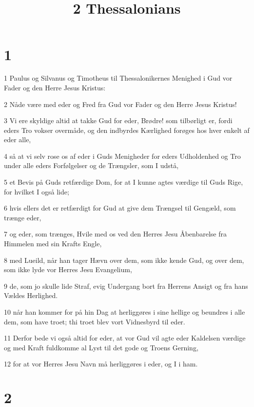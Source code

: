 

\title{2 Thessalonians}


\chapter{1}

\par 1 Paulus og Silvanus og Timotheus til Thessalonikernes Menighed i Gud vor Fader og den Herre Jesus Kristus:
\par 2 Nåde være med eder og Fred fra Gud vor Fader og den Herre Jesus Kristus!
\par 3 Vi ere skyldige altid at takke Gud for eder, Brødre! som tilbørligt er, fordi eders Tro vokser overmåde, og den indbyrdes Kærlighed forøges hos hver enkelt af eder alle,
\par 4 så at vi selv rose os af eder i Guds Menigheder for eders Udholdenhed og Tro under alle eders Forfølgelser og de Trængsler, som I udstå,
\par 5 et Bevis på Guds retfærdige Dom, for at I kunne agtes værdige til Guds Rige, for hvilket I også lide;
\par 6 hvis ellers det er retfærdigt for Gud at give dem Trængsel til Gengæld, som trænge eder,
\par 7 og eder, som trænges, Hvile med os ved den Herres Jesu Åbenbarelse fra Himmelen med sin Krafts Engle,
\par 8 med Lueild, når han tager Hævn over dem, som ikke kende Gud, og over dem, som ikke lyde vor Herres Jesu Evangelium,
\par 9 de, som jo skulle lide Straf, evig Undergang bort fra Herrens Ansigt og fra hans Vældes Herlighed.
\par 10 når han kommer for på hin Dag at herliggøres i sine hellige og beundres i alle dem, som have troet; thi troet blev vort Vidnesbyrd til eder.
\par 11 Derfor bede vi også altid for eder, at vor Gud vil agte eder Kaldelsen værdige og med Kraft fuldkomme al Lyst til det gode og Troens Gerning,
\par 12 for at vor Herres Jesu Navn må herliggøres i eder, og I i ham.

\chapter{2}

